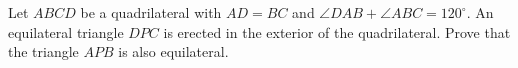 Let $ABCD$ be a quadrilateral with $AD = BC$ and $\angle DAB + \angle ABC = 120^\circ$. An equilateral triangle $DPC$ is erected in the exterior of the quadrilateral. Prove that the triangle $APB$ is also equilateral.